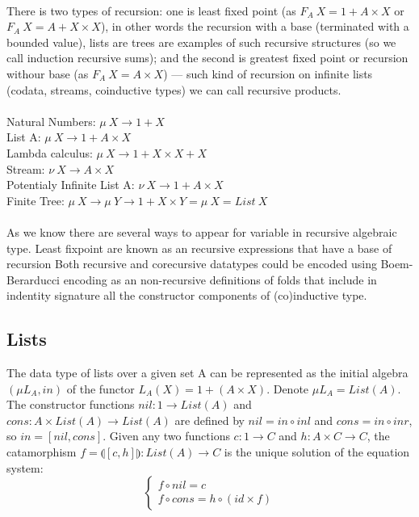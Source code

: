 \documentclass[11pt,oneside]{article}
\begin{document}
  \paragraph{}
  There is two types of recursion: one is least fixed point (as $F_A\ X = 1 + A\times X$ or $F_A\ X = A + X\times X$),
  in other words the recursion with a base (terminated with a bounded value), lists are trees are
  examples of such recursive structures (so we call induction recursive sums); and the second
  is greatest fixed point or recursion withour base (as $F_A\ X = A\times X $) --- such kind of
  recursion on infinite lists (codata, streams, coinductive types) we can call recursive products.\\
\\
  Natural Numbers: $\mu\ X \rightarrow 1 + X$ \\
  List A: $\mu\ X \rightarrow 1 + A \times X$ \\
  Lambda calculus: $\mu\ X \rightarrow 1 + X \times X + X$ \\
  Stream: $\nu\ X \rightarrow A \times X$ \\
  Potentialy Infinite List A: $\nu\ X \rightarrow 1 + A \times X$ \\
  Finite Tree: $\mu\ X \rightarrow \mu\ Y \rightarrow 1 + X \times Y = \mu\ X = List\ X$ \\

  \paragraph{}
  As we know there are several ways to appear for variable in recursive algebraic type.
  Least fixpoint are known as an recursive expressions that have a base of recursion
  Both recursive and corecursive datatypes could be encoded using Boem-Berarducci encoding
  as an non-recursive definitions of folds that include in indentity signature all the
  constructor components of (co)inductive type.

  \subsection{Lists}
  The data type of lists over a given set A can be represented as the initial algebra
  $(\mu L_A, in)$ of the functor $L_A(X) = 1 + (A \times X)$. Denote $\mu L_A = List(A)$.
  The constructor functions $nil: 1 \rightarrow List(A)$ and
  $cons: A \times List(A) \rightarrow List(A)$ are defined by
  $nil = in \circ inl$ and $cons = in \circ inr$, so $in = [nil,cons]$.
  Given any two functions $c: 1 \rightarrow C$ and $h: A \times C \rightarrow C$,
  the catamorphism $f = \llparenthesis [c,h] \rrparenthesis : List(A) \rightarrow C$
  is the unique solution of the equation system:
\vspace{0.3cm}
$$
\begin{cases}
  f \circ nil  = c \\
  f \circ cons = h \circ (id \times f)
\end{cases}
$$
\end{document}
